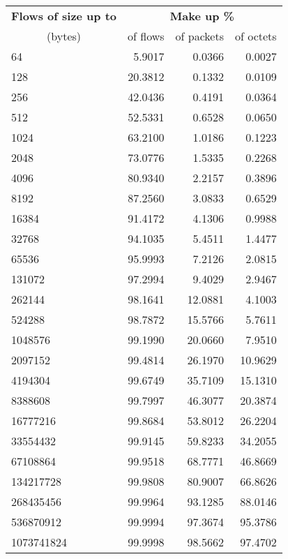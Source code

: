 \begin{tabular}{@{}lrrr@{}}
\toprule
\textbf{Flows of size up to} & \multicolumn{3}{c}{\textbf{Make up \%}} \\
\cmidrule(lr){2-4}
\multicolumn{1}{c}{(bytes)} & of flows & of packets & of octets \\
\midrule
64 & 5.9017 & 0.0366 & 0.0027 \\
128 & 20.3812 & 0.1332 & 0.0109 \\
256 & 42.0436 & 0.4191 & 0.0364 \\
512 & 52.5331 & 0.6528 & 0.0650 \\
1024 & 63.2100 & 1.0186 & 0.1223 \\
2048 & 73.0776 & 1.5335 & 0.2268 \\
4096 & 80.9340 & 2.2157 & 0.3896 \\
8192 & 87.2560 & 3.0833 & 0.6529 \\
16384 & 91.4172 & 4.1306 & 0.9988 \\
32768 & 94.1035 & 5.4511 & 1.4477 \\
65536 & 95.9993 & 7.2126 & 2.0815 \\
131072 & 97.2994 & 9.4029 & 2.9467 \\
262144 & 98.1641 & 12.0881 & 4.1003 \\
524288 & 98.7872 & 15.5766 & 5.7611 \\
1048576 & 99.1990 & 20.0660 & 7.9510 \\
2097152 & 99.4814 & 26.1970 & 10.9629 \\
4194304 & 99.6749 & 35.7109 & 15.1310 \\
8388608 & 99.7997 & 46.3077 & 20.3874 \\
16777216 & 99.8684 & 53.8012 & 26.2204 \\
33554432 & 99.9145 & 59.8233 & 34.2055 \\
67108864 & 99.9518 & 68.7771 & 46.8669 \\
134217728 & 99.9808 & 80.9007 & 66.8626 \\
268435456 & 99.9964 & 93.1285 & 88.0146 \\
536870912 & 99.9994 & 97.3674 & 95.3786 \\
1073741824 & 99.9998 & 98.5662 & 97.4702 \\
\bottomrule
\end{tabular}


